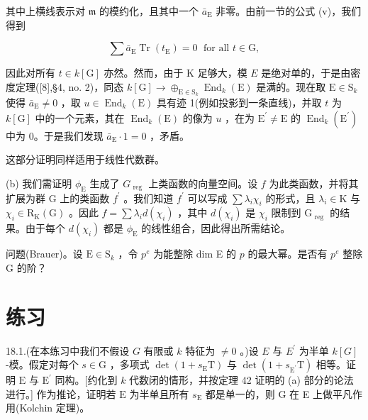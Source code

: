 \documentclass[10pt]{article}
\begin{document}
其中上横线表示对 \(\mathfrak{m}\) 的模约化，且其中一个 \({\bar{a}}_{\mathrm{E}}\) 非零。由前一节的公式 (v)，我们得到

\[
\sum {\bar{a}}_{\mathrm{E}}\operatorname{Tr}\left( {t}_{\mathrm{E}}\right)  = 0\;\text{ for all }t \in  \mathrm{G},
\]

因此对所有 \(t \in  k\left\lbrack  \mathrm{G}\right\rbrack\) 亦然。然而，由于 \(\mathrm{K}\) 足够大，模 \(E\) 是绝对单的，于是由密度定理([8],§4, no. 2)，同态 \(k\left\lbrack  \mathrm{G}\right\rbrack   \rightarrow  { \oplus  }_{\mathrm{E} \in  {\mathrm{S}}_{k}}{\operatorname{End}}_{k}\left( \mathrm{E}\right)\) 是满的。现在取 \(\mathrm{E} \in  {\mathrm{S}}_{k}\) 使得 \({\bar{a}}_{\mathrm{E}} \neq  0\) ，取 \(u \in  {\operatorname{End}}_{k}\left( \mathrm{E}\right)\) 具有迹 1(例如投影到一条直线)，并取 \(t\) 为 \(k\left\lbrack  \mathrm{G}\right\rbrack\) 中的一个元素，其在 \({\operatorname{End}}_{k}\left( \mathrm{E}\right)\) 的像为 \(u\) ，在为 \({\mathrm{E}}^{\prime } \neq  \mathrm{E}\) 的 \({\operatorname{End}}_{k}\left( {\mathrm{E}}^{\prime }\right)\) 中为 0。于是我们发现 \({\bar{a}}_{\mathrm{E}} \cdot  1 = 0\) ，矛盾。

这部分证明同样适用于线性代数群。

(b) 我们需证明 \({\phi }_{\mathrm{E}}\) 生成了 \({G}_{\text{ reg }}\) 上类函数的向量空间。设 \(f\) 为此类函数，并将其扩展为群 G 上的类函数 \({f}^{\prime }\) 。我们知道 \({f}^{\prime }\) 可以写成 \(\sum {\lambda }_{i}{\chi }_{i}\) 的形式，且 \({\lambda }_{i} \in  \mathrm{K}\) 与 \({\chi }_{i} \in  {\mathrm{R}}_{\mathrm{K}}\left( \mathrm{G}\right)\) 。因此 \(f = \sum {\lambda }_{i}d\left( {\chi }_{i}\right)\) ，其中 \(d\left( {\chi }_{i}\right)\) 是 \({\chi }_{i}\) 限制到 \({\mathrm{G}}_{\text{ reg }}\) 的结果。由于每个 \(d\left( {\chi }_{i}\right)\) 都是 \({\phi }_{\mathrm{E}}\) 的线性组合，因此得出所需结论。

问题(Brauer)。设 \(\mathrm{E} \in  {\mathrm{S}}_{k}\) ，令 \({p}^{e}\) 为能整除 dim E 的 \(p\) 的最大幂。是否有 \({p}^{e}\) 整除 G 的阶？

\section*{练习}

18.1.(在本练习中我们不假设 \(G\) 有限或 \(k\) 特征为 \(\neq  0\) 。)设 \(E\) 与 \({E}^{\prime }\) 为半单 \(k\left\lbrack  G\right\rbrack\) -模。假定对每个 \(s \in  \mathrm{G}\) ，多项式 \(\det \left( {1 + {s}_{\mathrm{E}}\mathrm{T}}\right)\) 与 \(\det \left( {1 + {s}_{{\mathrm{E}}^{\prime }}\mathrm{T}}\right)\) 相等。证明 \(\mathrm{E}\) 与 \({\mathrm{E}}^{\prime }\) 同构。[约化到 \(k\) 代数闭的情形，并按定理 42 证明的 (a) 部分的论法进行。] 作为推论，证明若 \(\mathrm{E}\) 为半单且所有 \({s}_{\mathrm{E}}\) 都是单一的，则 \(\mathrm{G}\) 在 E 上做平凡作用(Kolchin 定理)。
\end{document}
